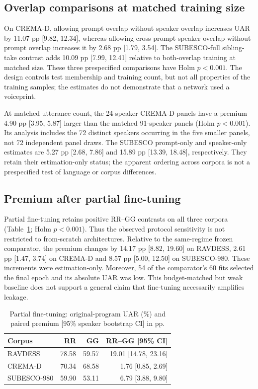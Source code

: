 \documentclass[letterpaper]{article}
\begin{document}
\subsection{Overlap comparisons at matched training size}
On CREMA-D, allowing prompt overlap without speaker overlap increases UAR by 11.07 pp [9.82, 12.34], whereas allowing cross-prompt speaker overlap without prompt overlap increases it by 2.68 pp [1.79, 3.54]. The SUBESCO-full sibling-take contrast adds 10.09 pp [7.99, 12.41] relative to both-overlap training at matched size. These three prespecified comparisons have Holm $p<0.001$. The design controls test membership and training count, but not all properties of the training samples; the estimates do not demonstrate that a network used a voiceprint.

At matched utterance count, the 24-speaker CREMA-D panels have a premium 4.90 pp [3.95, 5.87] larger than the matched 91-speaker panels (Holm $p<0.001$). Its analysis includes the 72 distinct speakers occurring in the five smaller panels, not 72 independent panel draws. The SUBESCO prompt-only and speaker-only estimates are 5.27 pp [2.68, 7.86] and 15.89 pp [13.39, 18.48], respectively. They retain their estimation-only status; the apparent ordering across corpora is not a prespecified test of language or corpus differences.

\subsection{Premium after partial fine-tuning}
Partial fine-tuning retains positive RR--GG contrasts on all three corpora (Table~\ref{tab:ft}; Holm $p<0.001$). Thus the observed protocol sensitivity is not restricted to from-scratch architectures. Relative to the same-regime frozen comparator, the premium changes by 14.17 pp [8.82, 19.60] on RAVDESS, 2.61 pp [1.47, 3.74] on CREMA-D and 8.57 pp [5.00, 12.50] on SUBESCO-980. These increments were estimation-only. Moreover, 54 of the comparator's 60 fits selected the final epoch and its absolute UAR was low. This budget-matched but weak baseline does not support a general claim that fine-tuning necessarily amplifies leakage.

\begin{table}[t]
\centering
\small
\caption{Partial fine-tuning: original-program UAR (\%) and paired premium [95\% speaker bootstrap CI] in pp.}
\label{tab:ft}
\setlength{\tabcolsep}{4pt}
\begin{tabular}{lrrr}\toprule
Corpus & RR & GG & RR--GG [95\% CI]\\\midrule
RAVDESS & 78.58 & 59.57 & 19.01 [14.78, 23.16]\\
CREMA-D & 70.34 & 68.58 & 1.76 [0.85, 2.69]\\
SUBESCO-980 & 59.90 & 53.11 & 6.79 [3.88, 9.80]\\\bottomrule
\end{tabular}
\end{table}
\end{document}
